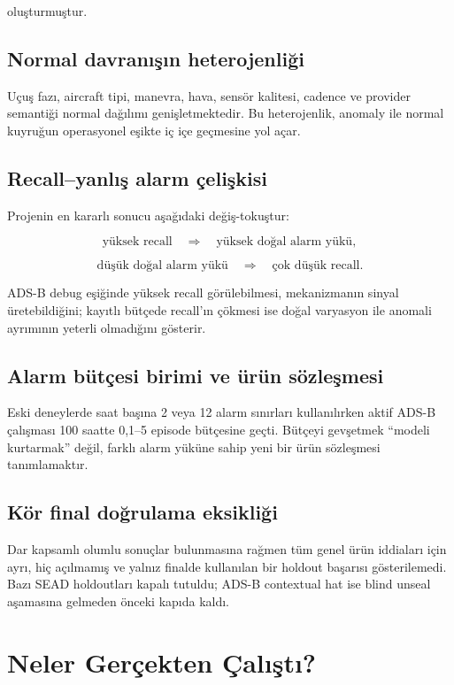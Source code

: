 \documentclass[11pt,a4paper,oneside]{report}
\begin{document}
oluşturmuştur.

\section{Normal davranışın heterojenliği}

Uçuş fazı, aircraft tipi, manevra, hava, sensör kalitesi, cadence ve provider
semantiği normal dağılımı genişletmektedir. Bu heterojenlik, anomaly ile
normal kuyruğun operasyonel eşikte iç içe geçmesine yol açar.

\section{Recall--yanlış alarm çelişkisi}

Projenin en kararlı sonucu aşağıdaki değiş-tokuştur:

\[
\text{yüksek recall}
\quad\Longrightarrow\quad
\text{yüksek doğal alarm yükü},
\]

\[
\text{düşük doğal alarm yükü}
\quad\Longrightarrow\quad
\text{çok düşük recall}.
\]

ADS-B debug eşiğinde yüksek recall görülebilmesi, mekanizmanın sinyal
üretebildiğini; kayıtlı bütçede recall'ın çökmesi ise doğal varyasyon ile
anomali ayrımının yeterli olmadığını gösterir.

\section{Alarm bütçesi birimi ve ürün sözleşmesi}

Eski deneylerde saat başına 2 veya 12 alarm sınırları kullanılırken aktif
ADS-B çalışması 100 saatte 0,1--5 episode bütçesine geçti. Bütçeyi gevşetmek
``modeli kurtarmak'' değil, farklı alarm yüküne sahip yeni bir ürün
sözleşmesi tanımlamaktır.

\section{Kör final doğrulama eksikliği}

Dar kapsamlı olumlu sonuçlar bulunmasına rağmen tüm genel ürün iddiaları için
ayrı, hiç açılmamış ve yalnız finalde kullanılan bir holdout başarısı
gösterilemedi. Bazı SEAD holdoutları kapalı tutuldu; ADS-B contextual hat ise
blind unseal aşamasına gelmeden önceki kapıda kaldı.

\chapter{Neler Gerçekten Çalıştı?}
\end{document}
